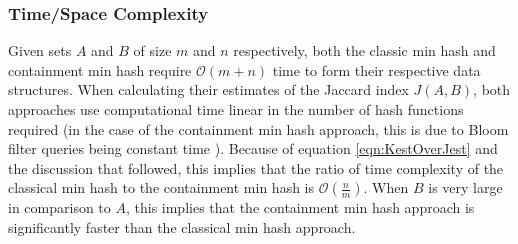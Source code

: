 \documentclass[11pt,reqno]{amsart}
\theoremstyle{remark}
\numberwithin{equation}{section}
\begin{document}
\subsubsection{Time/Space Complexity}
Given sets $A$ and $B$ of size $m$ and $n$ respectively, both the classic min hash and containment min hash require $\mathcal{O}(m+n)$ time to form their respective data structures. When calculating their estimates of the Jaccard index $J(A,B)$, both approaches use computational time linear in the number of hash functions required (in the case of the containment min hash approach, this is due to Bloom filter queries being constant time \cite{bloom1970space}). Because of equation \eqref{eqn:KestOverJest} and the discussion that followed, this implies that the ratio of time complexity of the classical min hash to the containment min hash is $\mathcal{O}(\frac{n}{m})$. When $B$ is very large in comparison to $A$, this implies that the containment min hash approach is significantly faster than the classical min hash approach.
\end{document}
